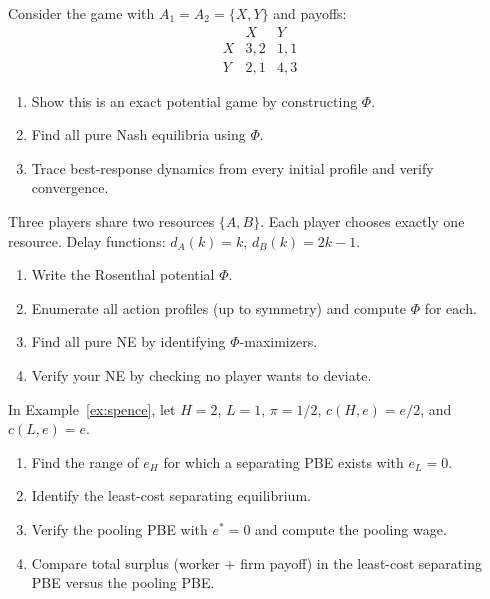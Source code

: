 \documentclass[11pt,a4paper]{article}
\begin{document}
\begin{exercise}
\label{ex:verify-potential}
Consider the game with $A_1 = A_2 = \{X, Y\}$ and payoffs:
\[
\begin{array}{c|cc}
  & X & Y \\ \hline
X & 3,2 & 1,1 \\
Y & 2,1 & 4,3
\end{array}
\]
\begin{enumerate}[label=(\alph*)]
    \item Show this is an exact potential game by constructing $\Phi$.
    \item Find all pure Nash equilibria using $\Phi$.
    \item Trace best-response dynamics from every initial profile and
    verify convergence.
\end{enumerate}
\end{exercise}

\begin{exercise}
\label{ex:congestion-three}
Three players share two resources $\{A, B\}$. Each player chooses
exactly one resource. Delay functions: $d_A(k) = k$, $d_B(k) = 2k - 1$.
\begin{enumerate}[label=(\alph*)]
    \item Write the Rosenthal potential $\Phi$.
    \item Enumerate all action profiles (up to symmetry) and compute
    $\Phi$ for each.
    \item Find all pure NE by identifying $\Phi$-maximizers.
    \item Verify your NE by checking no player wants to deviate.
\end{enumerate}
\end{exercise}

\begin{exercise}
\label{ex:spence-specific}
In Example~\ref{ex:spence}, let $H = 2$, $L = 1$, $\pi = 1/2$,
$c(H,e) = e/2$, and $c(L,e) = e$.
\begin{enumerate}[label=(\alph*)]
    \item Find the range of $e_H$ for which a separating PBE exists
    with $e_L = 0$.
    \item Identify the least-cost separating equilibrium.
    \item Verify the pooling PBE with $e^* = 0$ and compute the pooling
    wage.
    \item Compare total surplus (worker + firm payoff) in the least-cost
    separating PBE versus the pooling PBE.
\end{enumerate}
\end{exercise}
\end{document}
